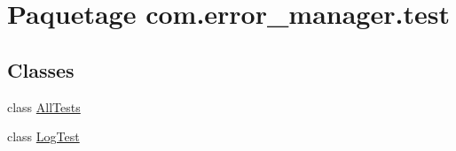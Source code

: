 \hypertarget{namespacecom_1_1error__manager_1_1test}{\section{Paquetage com.\-error\-\_\-manager.\-test}
\label{namespacecom_1_1error__manager_1_1test}
}
\subsection*{Classes}
\begin{DoxyCompactItemize}
\item 
class \hyperlink{classcom_1_1error__manager_1_1test_1_1AllTests}{All\-Tests}
\item 
class \hyperlink{classcom_1_1error__manager_1_1test_1_1LogTest}{Log\-Test}
\end{DoxyCompactItemize}
